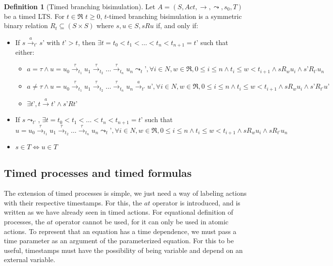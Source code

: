 \documentclass[11pt]{article}
\theoremstyle{definition}
\newtheorem{definition}{Definition}
\theoremstyle{plain}
\theoremstyle{definition}
\begin{document}
\begin{definition} [Timed branching bisimulation]
	Let $ A = (S, Act, \rightarrow, \leadsto, s_0, T) $ be a timed LTS. For $ t \in \Re $ $ t \geq 0 $, $ t $-timed branching bisimulation is a symmetric binary relation $ R_t  \subseteq (S\times S) $ where $ s, u \in S, s R u $ if, and only if:
	\begin{itemize}
		\item If $ s\xrightarrow{a}_{t’}s’$ with $ t’ > t $, then $ \exists t = t_0 < t_1 < \dots < t_n < t_{n+1} = t’ $ such that either:
		\begin{itemize}
			\item $ a = \tau \wedge u = u_0 \xrightarrow{\tau}_{t_1} u_1 \xrightarrow{\tau}_{t_2} \dots \xrightarrow{\tau}_{t_n} u_n \leadsto_t’ , \forall i \in N, w \in \Re, 0 \leq i \leq n \wedge t_i \leq w < t_{i+1} \wedge s R_w u_i \wedge s’ R_{t’} u_n $
			\item $ a \not = \tau \wedge u = u_0 \xrightarrow{\tau}_{t_1} u_1 \xrightarrow{\tau}_{t_2} \dots \xrightarrow{\tau}_{t_n} u_n \xrightarrow{a}_{t’} u’ , \forall i \in N, w \in \Re, 0 \leq i \leq n \wedge t_i \leq w < t_{i+1} \wedge s R_w u_i \wedge s’ R_{t’} u’ $
			\item $ \exists t’, t\xrightarrow{a}t’ \wedge s’ R t’ $
		\end{itemize}
		\item If $ s\leadsto_{t’}  $, $ \exists t = t_0 < t_1 < \dots < t_n < t_{n+1} = t’ $ such that $ u = u_0 \xrightarrow{\tau}_{t_1} u_1 \xrightarrow{\tau}_{t_2} \dots \xrightarrow{\tau}_{t_n} u_n \leadsto_t’ , \forall i \in N, w \in \Re, 0 \leq i \leq n \wedge t_i \leq w < t_{i+1} \wedge s R_w u_i \wedge s R_{t’} u_n $
		\item $ s \in T \iff u \in T $
	\end{itemize}
\end{definition}

\subsection{Timed processes and timed formulas}

The extension of timed processes is simple, we just need a way of labeling actions with their respective timestamps. For this, the $ at $ operator is introduced, and is written as we have already seen in timed actions. For equational definition of processes, the $ at $ operator cannot be used, for it can only be used in atomic actions. To represent that an equation has a time dependence, we must pass a time parameter as an argument of the parameterized equation. For this to be useful, timestamps must have the possibility of being variable and depend on an external variable.
\end{document}
